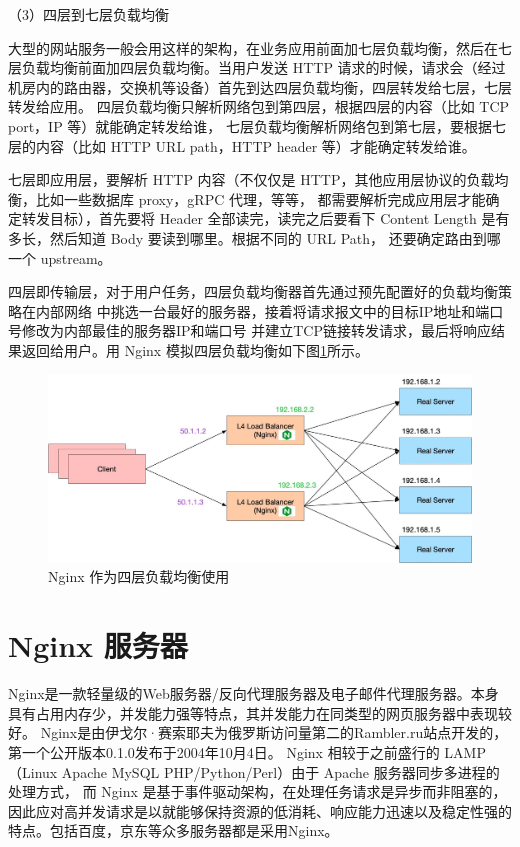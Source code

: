 （3）四层到七层负载均衡

大型的网站服务一般会用这样的架构，在业务应用前面加七层负载均衡，然后在七层负载均衡前面加四层负载均衡。当用户发送 HTTP 请求的时候，请求会（经过机房内的路由器，交换机等设备）首先到达四层负载均衡，四层转发给七层，七层转发给应用。
四层负载均衡只解析网络包到第四层，根据四层的内容（比如 TCP port，IP 等）就能确定转发给谁，
七层负载均衡解析网络包到第七层，要根据七层的内容（比如 HTTP URL path，HTTP header 等）才能确定转发给谁。

七层即应用层\cite{pak2015efficient}，要解析 HTTP 内容（不仅仅是 HTTP，其他应用层协议的负载均衡，比如一些数据库 proxy，gRPC 代理，等等，
都需要解析完成应用层才能确定转发目标），首先要将 Header 全部读完，读完之后要看下
Content Length 是有多长，然后知道 Body 要读到哪里。根据不同的 URL Path，
还要确定路由到哪一个 upstream。


四层即传输层，对于用户任务，四层负载均衡器首先通过预先配置好的负载均衡策略在内部网络
中挑选一台最好的服务器，接着将请求报文中的目标IP地址和端口号修改为内部最佳的服务器IP和端口号
并建立TCP链接转发请求，最后将响应结果返回给用户。用 Nginx 模拟四层负载均衡如下图\ref{four_land_balance}所示。

\begin{figure}[htb]
  \centering
  \includegraphics[width=\textwidth]{figures/nginx-l4lb-2048x911.jpg}
  \caption{Nginx 作为四层负载均衡使用}
  \label{four_land_balance}
\end{figure}

\section{Nginx 服务器}

Nginx是一款轻量级的Web服务器/反向代理服务器及电子邮件代理服务器。本身具有占用内存少，并发能力强等特点，其并发能力在同类型的网页服务器中表现较好。
Nginx是由伊戈尔·赛索耶夫为俄罗斯访问量第二的Rambler.ru站点开发的，第一个公开版本0.1.0发布于2004年10月4日。
Nginx 相较于之前盛行的 LAMP（Linux Apache MySQL PHP/Python/Perl）由于 Apache 服务器同步多进程的处理方式，
而 Nginx 是基于事件驱动架构，在处理任务请求是异步而非阻塞的，因此应对高并发请求是以就能够保持资源的低消耗、响应能力迅速以及稳定性强的特点\cite{凌质亿2013高并发环境下}。包括百度，京东等众多服务器都是采用Nginx。

